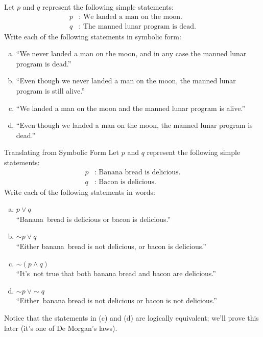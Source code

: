 \begin{try}
Let $p$ and $q$ represent the following simple statements:
\begin{align*}
p &: \textrm{ We landed a man on the moon.}\\
q &: \textrm{ The manned lunar program is dead.}
\end{align*}
Write each of the following statements in symbolic form:

\begin{enumerate}[(a)]
\item ``We never landed a man on the moon, and in any case the manned lunar program is dead.''
\item ``Even though we never landed a man on the moon, the manned lunar program is still alive.''
\item ``We landed a man on the moon and the manned lunar program is alive.''
\item ``Even though we landed a man on the moon, the manned lunar program is dead.''
\end{enumerate}
\end{try}

\begin{example}[https://www.youtube.com/watch?v=GZDdj5PjVXY]{Translating from Symbolic Form}
Let $p$ and $q$ represent the following simple statements:
\begin{align*}
p &: \textrm{ Banana bread is delicious.}\\
q &: \textrm{ Bacon is delicious.}
\end{align*}
Write each of the following statements in words:

\begin{enumerate}[(a)]
\item $p \vee q$\\

``Banana\sol\ bread is delicious or bacon is delicious.''
\vspace{0.1in}

\item $\sim p \vee q$\\

``Either banana\sol\ bread is not delicious, or bacon is delicious.''
\vspace{0.1in}

\item $\sim (p \wedge q)$\\

``It's\sol\ not true that both banana bread and bacon are delicious.''
\vspace{0.1in}

\item $\sim p\ \vee \sim q$\\

``Either\sol\ banana bread is not delicious or bacon is not delicious.''
\end{enumerate}

Notice that the statements in (c) and (d) are logically equivalent; we'll prove this later (it's one of De Morgan's laws).
\end{example}

